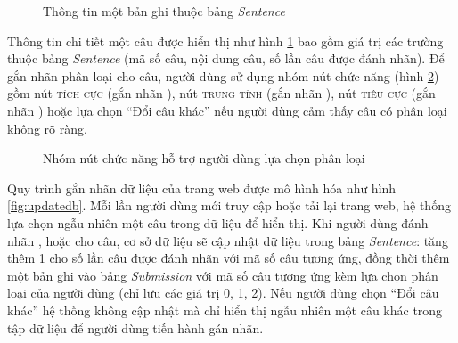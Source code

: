 \begin{figure}[h]
\centering
{}
\caption{Thông tin một bản ghi thuộc bảng \textit{Sentence}}
\label{fig:websen}
\end{figure}

Thông tin chi tiết một câu được hiển thị như hình \ref{fig:websen} bao gồm giá trị các trường thuộc bảng \textit{Sentence} (mã số câu, nội dung câu, số lần câu được đánh nhãn). Để gắn nhãn phân loại cho câu, người dùng sử dụng nhóm nút chức năng (hình \ref{fig:webbtn}) gồm nút \textsc{tích cực} (gắn nhãn \tichcuc), nút \textsc{trung tính} (gắn nhãn \trungtinh), nút \textsc{tiêu cực} (gắn nhãn \tieucuc) hoặc lựa chọn ``Đổi câu khác'' nếu người dùng cảm thấy câu có phân loại không rõ ràng.

\begin{figure}[h]
\centering
{}
\caption{Nhóm nút chức năng hỗ trợ người dùng lựa chọn phân loại}
\label{fig:webbtn}
\end{figure}

Quy trình gắn nhãn dữ liệu của trang web được mô hình hóa như hình \ref{fig:updatedb}. Mỗi lần người dùng mới truy cập hoặc tải lại trang web, hệ thống lựa chọn ngẫu nhiên một câu trong dữ liệu để hiển thị. Khi người dùng đánh nhãn \tichcuc, \tieucuc hoặc \trungtinh cho câu, cơ sở dữ liệu sẽ cập nhật dữ liệu trong bảng \textit{Sentence}: tăng thêm 1 cho số lần câu được đánh nhãn với mã số câu tương ứng, đồng thời thêm một bản ghi vào bảng \textit{Submission} với mã số câu tương ứng kèm lựa chọn phân loại của người dùng (chỉ lưu các giá trị 0, 1, 2). Nếu người dùng chọn ``Đổi câu khác'' hệ thống không cập nhật mà chỉ hiển thị ngẫu nhiên một câu khác trong tập dữ liệu để người dùng tiến hành gán nhãn.


